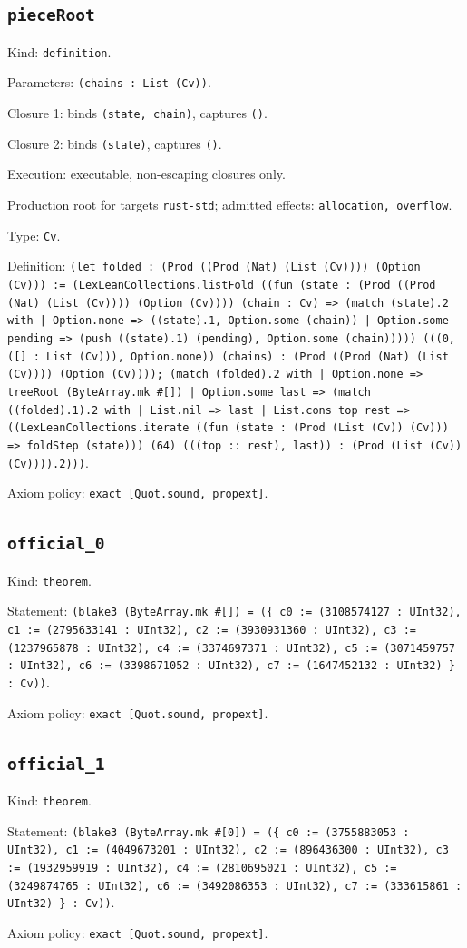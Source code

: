 \documentclass[11pt]{article}
\begin{document}
\subsection*{\texttt{pieceRoot}}
\noindent Kind: \texttt{definition}.\par
\noindent Parameters: \texttt{(chains : List (Cv))}.\par
\noindent Closure 1: binds \texttt{(state, chain)}, captures \texttt{()}.\par
\noindent Closure 2: binds \texttt{(state)}, captures \texttt{()}.\par
\noindent Execution: executable, non-escaping closures only.\par
\noindent Production root for targets \texttt{rust-std}; admitted effects: \texttt{allocation, overflow}.\par
\noindent Type: \texttt{Cv}.\par
\noindent Definition: \texttt{(let folded : (Prod ((Prod (Nat) (List (Cv)))) (Option (Cv))) := (LexLeanCollections.listFold ((fun (state : (Prod ((Prod (Nat) (List (Cv)))) (Option (Cv)))) (chain : Cv) => (match (state).2 with | Option.none => ((state).1, Option.some (chain)) | Option.some pending => (push ((state).1) (pending), Option.some (chain))))) (((0, ([] : List (Cv))), Option.none)) (chains) : (Prod ((Prod (Nat) (List (Cv)))) (Option (Cv)))); (match (folded).2 with | Option.none => treeRoot (ByteArray.mk \#[]) | Option.some last => (match ((folded).1).2 with | List.nil => last | List.cons top rest => ((LexLeanCollections.iterate ((fun (state : (Prod (List (Cv)) (Cv))) => foldStep (state))) (64) (((top :: rest), last)) : (Prod (List (Cv)) (Cv)))).2)))}.\par
\noindent Axiom policy: \texttt{exact [Quot.sound, propext]}.\par
\subsection*{\texttt{official\_0}}
\noindent Kind: \texttt{theorem}.\par
\noindent Statement: \texttt{(blake3 (ByteArray.mk \#[]) = (\{ c0 := (3108574127 : UInt32), c1 := (2795633141 : UInt32), c2 := (3930931360 : UInt32), c3 := (1237965878 : UInt32), c4 := (3374697371 : UInt32), c5 := (3071459757 : UInt32), c6 := (3398671052 : UInt32), c7 := (1647452132 : UInt32) \} : Cv))}.\par
\noindent Axiom policy: \texttt{exact [Quot.sound, propext]}.\par
\subsection*{\texttt{official\_1}}
\noindent Kind: \texttt{theorem}.\par
\noindent Statement: \texttt{(blake3 (ByteArray.mk \#[0]) = (\{ c0 := (3755883053 : UInt32), c1 := (4049673201 : UInt32), c2 := (896436300 : UInt32), c3 := (1932959919 : UInt32), c4 := (2810695021 : UInt32), c5 := (3249874765 : UInt32), c6 := (3492086353 : UInt32), c7 := (333615861 : UInt32) \} : Cv))}.\par
\noindent Axiom policy: \texttt{exact [Quot.sound, propext]}.\par
\end{document}
